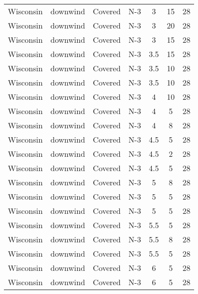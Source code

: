 \documentclass{article}
\begin{document}
\begin{longtable}[c]{ccccccc}
Wisconsin & downwind  & Covered     & N-3             & 3            & 15          & 28  \\
Wisconsin & downwind  & Covered     & N-3             & 3            & 20          & 28  \\
Wisconsin & downwind  & Covered     & N-3             & 3            & 15          & 28  \\
Wisconsin & downwind  & Covered     & N-3             & 3.5          & 15          & 28  \\
Wisconsin & downwind  & Covered     & N-3             & 3.5          & 10          & 28  \\
Wisconsin & downwind  & Covered     & N-3             & 3.5          & 10          & 28  \\
Wisconsin & downwind  & Covered     & N-3             & 4            & 10          & 28  \\
Wisconsin & downwind  & Covered     & N-3             & 4            & 5           & 28  \\
Wisconsin & downwind  & Covered     & N-3             & 4            & 8           & 28  \\
Wisconsin & downwind  & Covered     & N-3             & 4.5          & 5           & 28  \\
Wisconsin & downwind  & Covered     & N-3             & 4.5          & 2           & 28  \\
Wisconsin & downwind  & Covered     & N-3             & 4.5          & 5           & 28  \\
Wisconsin & downwind  & Covered     & N-3             & 5            & 8           & 28  \\
Wisconsin & downwind  & Covered     & N-3             & 5            & 5           & 28  \\
Wisconsin & downwind  & Covered     & N-3             & 5            & 5           & 28  \\
Wisconsin & downwind  & Covered     & N-3             & 5.5          & 5           & 28  \\
Wisconsin & downwind  & Covered     & N-3             & 5.5          & 8           & 28  \\
Wisconsin & downwind  & Covered     & N-3             & 5.5          & 5           & 28  \\
Wisconsin & downwind  & Covered     & N-3             & 6            & 5           & 28  \\
Wisconsin & downwind  & Covered     & N-3             & 6            & 5           & 28  \\

\end{longtable}
\end{document}
